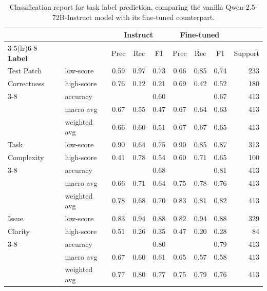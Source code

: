 \documentclass[dandb]{article}
\begin{document}
\begin{table}[htbp]
\centering
\caption{Classification report for task label prediction, comparing the vanilla Qwen-2.5-72B-Instruct model with its fine-tuned counterpart.}
\label{tab:alltasks_fullreport}
\begin{tabular}{l l ccc ccc r} %
\toprule
& & \multicolumn{3}{c}{\textbf{Instruct}} & \multicolumn{3}{c}{\textbf{Fine-tuned}} & \\ 
\cmidrule(lr){3-5}\cmidrule(lr){6-8} 
\textbf{Label} & & 
\multicolumn{1}{c}{Prec} & \multicolumn{1}{c}{Rec} &
\multicolumn{1}{c}{F1} &
\multicolumn{1}{c}{Prec} & \multicolumn{1}{c}{Rec} &
\multicolumn{1}{c}{F1} & {Support} \\ 
\midrule
Test Patch & low-score      & 0.59 & 0.97 & 0.73 & 0.66 & 0.85 & 0.74 & 233 \\
Correctness & high-score     & 0.76 & 0.12 & 0.21 & 0.69 & 0.42 & 0.52 & 180 \\
\cmidrule(lr){3-8} 
 & accuracy       &      &      & 0.60 &      &      & 0.67 & 413 \\
 & macro avg      & 0.67 & 0.55 & 0.47 & 0.67 & 0.64 & 0.63 & 413 \\
 & weighted avg   & 0.66 & 0.60 & 0.51 & 0.67 & 0.67 & 0.65 & 413 \\
\midrule
Task & low-score      & 0.90 & 0.64 & 0.75 & 0.90 & 0.85 & 0.87 & 313 \\
Complexity & high-score     & 0.41 & 0.78 & 0.54 & 0.60 & 0.71 & 0.65 & 100 \\
\cmidrule(lr){3-8}
 & accuracy       &      &      & 0.68 &      &      & 0.81 & 413 \\
 & macro avg      & 0.66 & 0.71 & 0.64 & 0.75 & 0.78 & 0.76 & 413 \\
 & weighted avg   & 0.78 & 0.68 & 0.70 & 0.83 & 0.81 & 0.82 & 413 \\
\midrule
Issue & low-score      & 0.83 & 0.94 & 0.88 & 0.82 & 0.94 & 0.88 & 329 \\
Clarity & high-score     & 0.51 & 0.26 & 0.35 & 0.47 & 0.20 & 0.28 &  84 \\
\cmidrule(lr){3-8}
 & accuracy       &      &      & 0.80 &      &      & 0.79 & 413 \\
 & macro avg      & 0.67 & 0.60 & 0.61 & 0.65 & 0.57 & 0.58 & 413 \\
 & weighted avg   & 0.77 & 0.80 & 0.77 & 0.75 & 0.79 & 0.76 & 413 \\
\bottomrule
\end{tabular}
\end{table}
\end{document}

